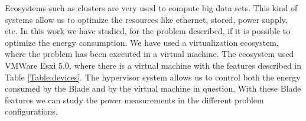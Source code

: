 Ecosystems such as clusters are very used to compute big data sets. This kind of systems allow us to optimize the resources like ethernet, stored, power supply, etc. In this work we have studied, for the problem described, if it is possible to optimize the energy consumption. We have used a virtualization ecosystem, where the problem has been executed in a virtual machine. The ecosystem used VMWare Esxi 5.0, where there is a virtual machine with the features described in Table \ref{Table:devices}. The hypervisor system allows us to control both the energy consumed by the Blade and by the virtual machine in question. With these Blade features we can study the power measurements in the different problem configurations.









